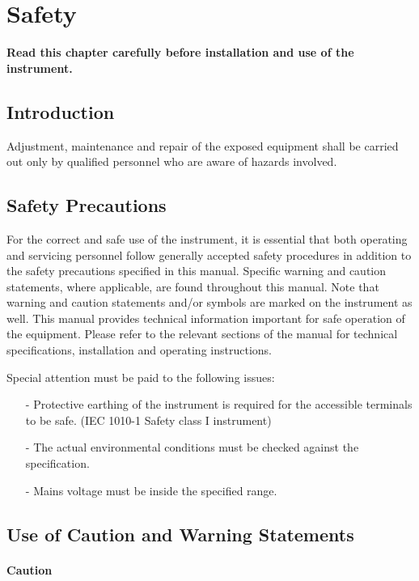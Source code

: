 \section{Safety}
\label{cha:Safety}

\textbf{Read this chapter carefully before installation and use of the instrument.}

\subsection{Introduction}
Adjustment, maintenance and repair of the exposed equipment shall be carried out only by qualified personnel who are aware of hazards involved.

\subsection{Safety Precautions}
For the correct and safe use of the instrument, it is essential that both operating and servicing personnel follow generally accepted safety procedures in addition to the safety precautions specified in this manual. Specific warning and caution statements, where applicable, are found throughout this manual. Note that warning and caution statements and/or symbols are marked on the instrument as well. This manual provides technical information important for safe operation of the equipment. Please refer to the relevant sections of the manual for technical specifications, installation and
operating instructions. 

Special attention must be paid to the following issues:

\begin{itemize}
\item[-] Protective earthing of the instrument is required for the accessible terminals to be safe. (IEC 1010-1 Safety class I instrument)
%
\item[-] The actual environmental conditions must be checked against the specification.
\item[-] Mains voltage must be inside the specified range.
\end{itemize}

\subsection{Use of Caution and Warning Statements}

\paragraph{Caution}

